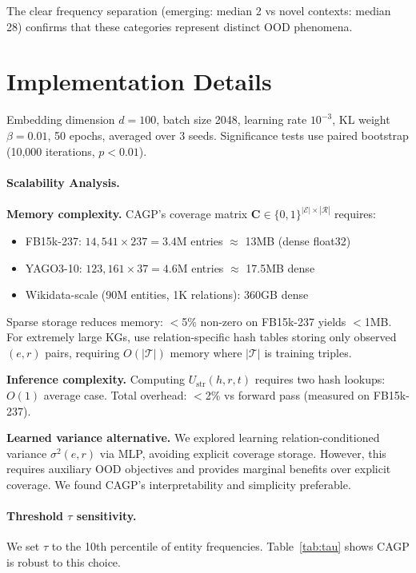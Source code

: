 \documentclass[accepted]{uai2024}  %
\newcommand{\mat}[1]{\mathbf{#1}}
\begin{document}
The clear frequency separation (emerging: median 2 vs novel contexts: median 28) confirms that these categories represent distinct OOD phenomena.

\section{Implementation Details}
\label{app:implementation}

Embedding dimension $d=100$, batch size 2048, learning rate $10^{-3}$, KL weight $\beta=0.01$, 50 epochs, averaged over 3 seeds.
Significance tests use paired bootstrap (10,000 iterations, $p < 0.01$).

\paragraph{Scalability Analysis.}
\textbf{Memory complexity.} CAGP's coverage matrix $\mat{C} \in \{0,1\}^{|\mathcal{E}| \times |\mathcal{R}|}$ requires:
\begin{itemize}
\item FB15k-237: $14{,}541 \times 237 = 3.4$M entries $\approx$ 13MB (dense float32)
\item YAGO3-10: $123{,}161 \times 37 = 4.6$M entries $\approx$ 17.5MB dense
\item Wikidata-scale (90M entities, 1K relations): 360GB dense
\end{itemize}
Sparse storage reduces memory: $<$5\% non-zero on FB15k-237 yields $<$1MB. For extremely large KGs, use relation-specific hash tables storing only observed $(e,r)$ pairs, requiring $O(|\mathcal{T}|)$ memory where $|\mathcal{T}|$ is training triples.

\textbf{Inference complexity.} Computing $U_{\text{str}}(h,r,t)$ requires two hash lookups: $O(1)$ average case. Total overhead: $<$2\% vs forward pass (measured on FB15k-237).

\textbf{Learned variance alternative.} We explored learning relation-conditioned variance $\sigma^2(e,r)$ via MLP, avoiding explicit coverage storage. However, this requires auxiliary OOD objectives and provides marginal benefits over explicit coverage. We found CAGP's interpretability and simplicity preferable.

\paragraph{Threshold $\tau$ sensitivity.}
We set $\tau$ to the 10th percentile of entity frequencies. Table~\ref{tab:tau} shows CAGP is robust to this choice.
\end{document}
